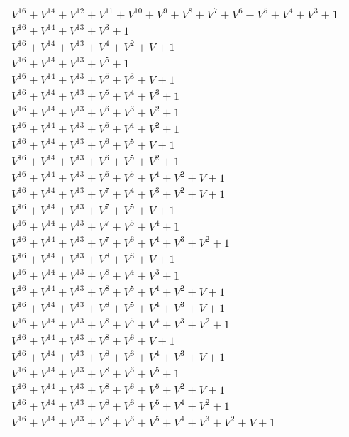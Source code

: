 \documentclass[12pt]{article}
\begin{document}
\begin{adjustwidth}{-4cm}{}
\begin{center}
\begin{longtable}{|l|}
$V^{16}  +V^{14}  +V^{12}  +V^{11}  +V^{10}  +V^{9}  +V^{8}  +V^{7}  +V^{6}  +V^{5}  +V^{4}  +V^{3}  + 1$ \\
$V^{16}  +V^{14}  +V^{13}  +V^{3}  + 1$ \\
$V^{16}  +V^{14}  +V^{13}  +V^{4}  +V^{2}  + V + 1$ \\
$V^{16}  +V^{14}  +V^{13}  +V^{5}  + 1$ \\
$V^{16}  +V^{14}  +V^{13}  +V^{5}  +V^{3}  + V + 1$ \\
$V^{16}  +V^{14}  +V^{13}  +V^{5}  +V^{4}  +V^{3}  + 1$ \\
$V^{16}  +V^{14}  +V^{13}  +V^{6}  +V^{3}  +V^{2}  + 1$ \\
$V^{16}  +V^{14}  +V^{13}  +V^{6}  +V^{4}  +V^{2}  + 1$ \\
$V^{16}  +V^{14}  +V^{13}  +V^{6}  +V^{5}  + V + 1$ \\
$V^{16}  +V^{14}  +V^{13}  +V^{6}  +V^{5}  +V^{2}  + 1$ \\
$V^{16}  +V^{14}  +V^{13}  +V^{6}  +V^{5}  +V^{4}  +V^{2}  + V + 1$ \\
$V^{16}  +V^{14}  +V^{13}  +V^{7}  +V^{4}  +V^{3}  +V^{2}  + V + 1$ \\
$V^{16}  +V^{14}  +V^{13}  +V^{7}  +V^{5}  + V + 1$ \\
$V^{16}  +V^{14}  +V^{13}  +V^{7}  +V^{5}  +V^{4}  + 1$ \\
$V^{16}  +V^{14}  +V^{13}  +V^{7}  +V^{6}  +V^{4}  +V^{3}  +V^{2}  + 1$ \\
$V^{16}  +V^{14}  +V^{13}  +V^{8}  +V^{3}  + V + 1$ \\
$V^{16}  +V^{14}  +V^{13}  +V^{8}  +V^{4}  +V^{3}  + 1$ \\
$V^{16}  +V^{14}  +V^{13}  +V^{8}  +V^{5}  +V^{4}  +V^{2}  + V + 1$ \\
$V^{16}  +V^{14}  +V^{13}  +V^{8}  +V^{5}  +V^{4}  +V^{3}  + V + 1$ \\
$V^{16}  +V^{14}  +V^{13}  +V^{8}  +V^{5}  +V^{4}  +V^{3}  +V^{2}  + 1$ \\
$V^{16}  +V^{14}  +V^{13}  +V^{8}  +V^{6}  + V + 1$ \\
$V^{16}  +V^{14}  +V^{13}  +V^{8}  +V^{6}  +V^{4}  +V^{3}  + V + 1$ \\
$V^{16}  +V^{14}  +V^{13}  +V^{8}  +V^{6}  +V^{5}  + 1$ \\
$V^{16}  +V^{14}  +V^{13}  +V^{8}  +V^{6}  +V^{5}  +V^{2}  + V + 1$ \\
$V^{16}  +V^{14}  +V^{13}  +V^{8}  +V^{6}  +V^{5}  +V^{4}  +V^{2}  + 1$ \\
$V^{16}  +V^{14}  +V^{13}  +V^{8}  +V^{6}  +V^{5}  +V^{4}  +V^{3}  +V^{2}  + V + 1$ \\

\end{longtable}
\end{center}
\end{adjustwidth}
\end{document}
